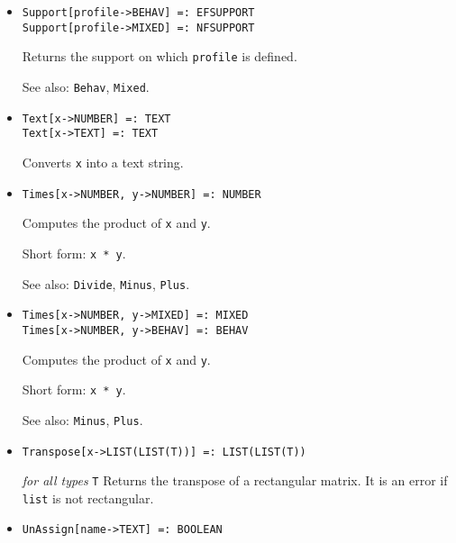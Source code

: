 \begin{itemize}
\item{}
\protect \large \begin{verbatim}
Support[profile->BEHAV] =: EFSUPPORT 
Support[profile->MIXED] =: NFSUPPORT 
\end{verbatim}\normalsize

\bd
Returns the support on which \verb+profile+ is defined.
\item [See also:] \verb+Behav+, \verb+Mixed+.
\ed


\item{}
\protect \large \begin{verbatim}
Text[x->NUMBER] =: TEXT 
Text[x->TEXT] =: TEXT 
\end{verbatim} \normalsize

\bd
Converts \verb+x+ into a text string.
\ed

\item{} 
\protect \large \begin{verbatim}
Times[x->NUMBER, y->NUMBER] =: NUMBER 
\end{verbatim} \normalsize

\bd
Computes the product of \verb+x+ and \verb+y+.
\item [Short form:] \verb+x * y+.
\item [See also:] \verb+Divide+, \verb+Minus+, \verb+Plus+.
\ed

\item{}
\protect \large \begin{verbatim}
Times[x->NUMBER, y->MIXED] =: MIXED 
Times[x->NUMBER, y->BEHAV] =: BEHAV 
\end{verbatim} \normalsize

\bd
Computes the product of \verb+x+ and \verb+y+.
\item [Short form:] \verb+x * y+.
\item [See also:] \verb+Minus+, \verb+Plus+.
\ed

\item{}
\protect \large \begin{verbatim} 
Transpose[x->LIST(LIST(T))] =: LIST(LIST(T)) 
\end{verbatim}\normalsize

{\it for all types} {\tt T}
\bd
Returns the transpose of a rectangular matrix.  It is an error if \verb+list+
is not rectangular.
\ed



\item{}
\protect \large \begin{verbatim}
UnAssign[name->TEXT] =: BOOLEAN
\end{verbatim}\normalsize


\end{itemize}
